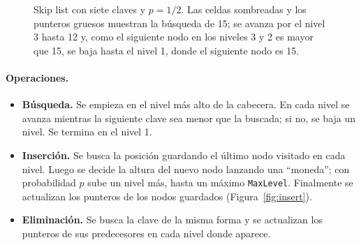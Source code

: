 \documentclass[11pt,a4paper]{article}
\begin{document}
\begin{figure}[!htb]
\centering
{}
\caption{Skip list con siete claves y $p = 1/2$. Las celdas sombreadas y los
punteros gruesos muestran la búsqueda de 15; se avanza por el nivel 3 hasta
12 y, como el siguiente nodo en los niveles 3 y 2 es mayor que 15, se baja hasta
el nivel 1, donde el siguiente nodo es 15.}
\label{fig:skiplist}
\end{figure}

\paragraph{Operaciones.}
\begin{itemize}
  \item \textbf{Búsqueda.} Se empieza en el nivel más alto de la cabecera. En
  cada nivel se avanza mientras la siguiente clave sea menor que la buscada; si
  no, se baja un nivel. Se termina en el nivel 1.
  \item \textbf{Inserción.} Se busca la posición guardando el último nodo
  visitado en cada nivel. Luego se decide la altura del nuevo nodo lanzando una
  ``moneda''; con probabilidad $p$ sube un nivel más, hasta un máximo
  \texttt{MaxLevel}. Finalmente se actualizan los punteros de los nodos
  guardados (Figura~\ref{fig:insert}).
  \item \textbf{Eliminación.} Se busca la clave de la misma forma y se
  actualizan los punteros de sus predecesores en cada nivel donde aparece.
\end{itemize}
\end{document}
